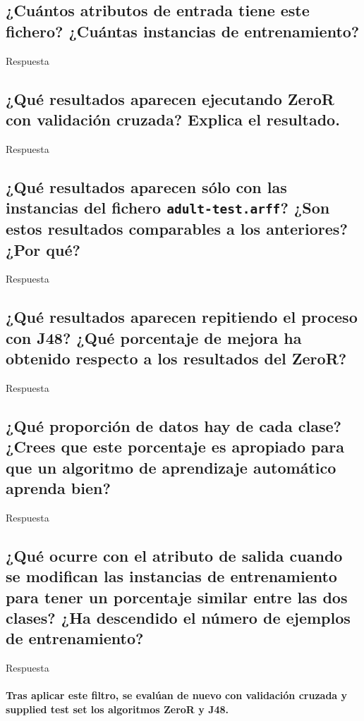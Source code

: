\documentclass[12pt]{article}
\begin{document}
\subsection*{\small ¿Cuántos atributos de entrada tiene este fichero? ¿Cuántas
instancias de entrenamiento?}

Respuesta

\subsection*{\small ¿Qué resultados aparecen ejecutando ZeroR con validación
cruzada? Explica el resultado.}

Respuesta

\subsection*{\small ¿Qué resultados aparecen sólo con las instancias del fichero
\texttt{adult-test.arff}? ¿Son estos resultados comparables a los anteriores?
¿Por qué?}

Respuesta

\subsection*{\small ¿Qué resultados aparecen repitiendo el proceso con J48?
¿Qué porcentaje de mejora ha obtenido respecto a los resultados del ZeroR?}

Respuesta

\subsection*{\small ¿Qué proporción de datos hay de cada clase? ¿Crees que este
porcentaje es apropiado para que un algoritmo de aprendizaje automático aprenda
bien?}

Respuesta

\subsection*{\small ¿Qué ocurre con el atributo de salida cuando se modifican
las instancias de entrenamiento para tener un porcentaje similar entre las dos
clases? ¿Ha descendido el número de ejemplos de entrenamiento?}

Respuesta

\paragraph{\small Tras aplicar este filtro, se evalúan de nuevo con validación
cruzada y supplied test set los algoritmos ZeroR y J48.}
\end{document}
